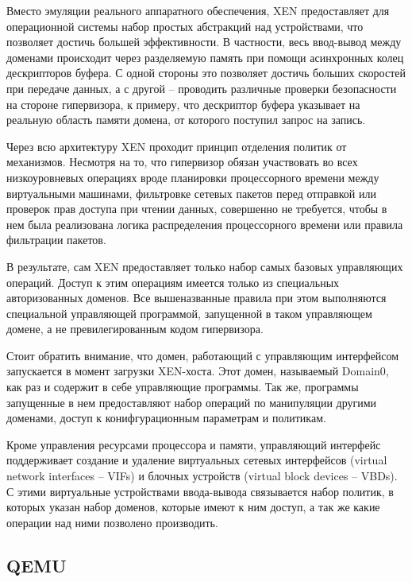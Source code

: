
Вместо эмуляции реального аппаратного обеспечения, XEN предоставляет для операционной
системы набор простых абстракций над устройствами, что позволяет достичь большей
эффективности. В частности, весь ввод-вывод между доменами происходит через разделяемую
память при помощи асинхронных колец дескрипторов буфера. С одной стороны это позволяет
достичь больших скоростей при передаче данных, а с другой -- проводить различные 
проверки безопасности на стороне гипервизора, к примеру, что дескриптор буфера указывает
на реальную область памяти домена, от которого поступил запрос на запись.

Через всю архитектуру XEN проходит принцип отделения политик от механизмов. Несмотря на
то, что гипервизор обязан участвовать во всех низкоуровневых операциях вроде планировки
процессорного времени между виртуальными машинами, фильтровке сетевых пакетов перед
отправкой или проверок прав доступа при чтении данных, совершенно не требуется, чтобы 
в нем была реализована логика распределения процессорного времени или правила фильтрации
пакетов.

В результате, сам XEN предоставляет только набор самых базовых управляющих операций.
Доступ к этим операциям имеется только из специальных авторизованных доменов. Все 
вышеназванные правила при этом выполняются специальной управляющей программой, 
запущенной в таком управляющем домене, а не превилегированным кодом гипервизора.

Стоит обратить внимание, что домен, работающий с управляющим интерфейсом запускается
в момент загрузки XEN-хоста. Этот домен, называемый Domain0, как раз и содержит в себе
управляющие программы. Так же, программы запущенные в нем предоставляют набор операций
по манипуляции другими доменами, доступ к конифгурационным параметрам и политикам.

Кроме управления ресурсами процессора и памяти, управляющий интерфейс поддерживает
создание и удаление виртуальных сетевых интерфейсов (virtual network interfaces -- VIFs) и 
блочных устройств (virtual block devices -- VBDs). С этими виртуальные устройствами ввода-вывода
связывается набор политик, в которых указан набор доменов, которые имеют к ним доступ,
а так же какие операции над ними позволено производить.
\cite{Barham:2003:XAV:1165389.945462}

\subsection{QEMU}


